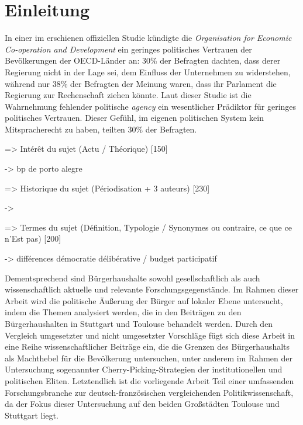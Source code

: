 

\section{Einleitung}


In einer im \cite*{OECD2025GovernmentAtAGlance} erschienen offiziellen Studie kündigte die \textit{Organisation for Economic Co-operation and Development} ein geringes politisches Vertrauen der Bevölkerungen der OECD-Länder an: 
    30\% der Befragten dachten, dass derer Regierung nicht in der Lage sei, dem Einfluss der Unternehmen zu widerstehen, während nur 38\% der Befragten der Meinung waren, dass ihr Parlament die Regierung zur Rechenschaft ziehen könnte.
Laut dieser Studie ist die Wahrnehmung fehlender politische \textit{agency} ein wesentlicher Prädiktor für geringes politisches Vertrauen.
Dieser Gefühl, im eigenen politischen System kein Mitspracherecht zu haben, teilten 30\% der Befragten. 





=> Intérêt du sujet (Actu / Théorique) [150]


-> bp de porto alegre



=> Historique du sujet (Périodisation + 3 auteurs) [230]

    -> 



=> Termes du sujet (Définition, Typologie / Synonymes ou contraire, ce que ce n’Est pas) [200]

    -> différences démocratie délibérative / budget participatif



Dementsprechend sind Bürgerhaushalte sowohl gesellschaftlich als auch wissenschaftlich aktuelle und relevante Forschungsgegenstände.
Im Rahmen dieser Arbeit wird die politische Äußerung der Bürger auf lokaler Ebene untersucht, indem die Themen analysiert werden, die in den Beiträgen zu den Bürgerhaushalten in Stuttgart und Toulouse behandelt werden.
Durch den Vergleich umgesetzter und nicht umgesetzter Vorschläge fügt sich diese Arbeit in eine Reihe wissenschaftlicher Beiträge ein, die die Grenzen des Bürgerhaushalts als Machthebel für die Bevölkerung untersuchen, unter anderem im Rahmen der Untersuchung sogenannter Cherry-Picking-Strategien der institutionellen und politischen Eliten.
Letztendlich ist die vorliegende Arbeit Teil einer umfassenden Forschungsbranche zur deutsch-französischen vergleichenden Politikwissenschaft, da der Fokus dieser Untersuchung auf den beiden Großstädten Toulouse und Stuttgart liegt. \\

